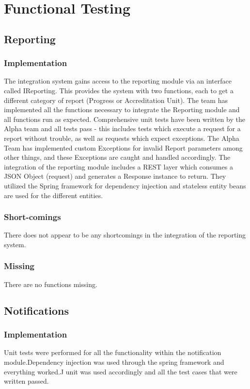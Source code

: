 \documentclass{article}
\begin{document}
\section{Functional Testing}
	\subsection{Reporting}
		\subsubsection{Implementation}
		The integration system gains access to the reporting module via an interface called IReporting. This provides the system with two functions, each to get a different category of report (Progress or Accreditation Unit). The team has implemented all the functions necessary to integrate the Reporting module and all functions run as expected. Comprehensive unit tests have been written by the Alpha team and all tests pass - this includes tests which execute a request for a report without trouble, as well as requests which expect exceptions. The Alpha Team has implemented custom Exceptions for invalid Report parameters among other things, and these Exceptions are caught and handled accordingly. The integration of the reporting module includes a REST layer which consumes a JSON Object (request) and generates a Response instance to return. They utilized the Spring framework for dependency injection and stateless entity beans are used for the different entities.
		\subsubsection{Short-comings}
		There does not appear to be any shortcomings in the integration of the reporting system.
		\subsubsection{Missing}
		There are no functions missing.
		
	\subsection{Notifications}
		\subsubsection{Implementation}
		Unit tests were performed for all the functionality within the notification module.Dependency injection was used through the spring framework and everything worked.J unit was used accordingly and all the test cases that were written passed.
\end{document}
